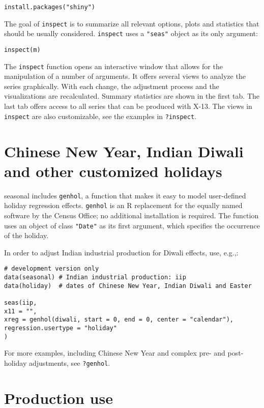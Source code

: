 \begin{verbatim}
install.packages("shiny")
\end{verbatim}

The goal of \texttt{inspect} is to summarize all relevant options, plots
and statistics that should be usually considered. \texttt{inspect} uses
a \texttt{"seas"} object as its only argument:

\begin{verbatim}
inspect(m)
\end{verbatim}

The \texttt{inspect} function opens an interactive window that allows
for the manipulation of a number of arguments. It offers several views
to analyze the series graphically. With each change, the adjustment
process and the visualizations are recalculated. Summary statistics are
shown in the first tab. The last tab offers access to all series that
can be produced with X-13. The views in \texttt{inspect} are also
customizable, see the examples in \texttt{?inspect}.

\section{Chinese New Year, Indian Diwali and other customized
holidays}\label{chinese-new-year-indian-diwali-and-other-customized-holidays}

seasonal includes \texttt{genhol}, a function that makes it easy to
model user-defined holiday regression effects. \texttt{genhol} is an R
replacement for the equally named software by the Census Office; no
additional installation is required. The function uses an object of
class \texttt{"Date"} as its first argument, which specifies the
occurrence of the holiday.

In order to adjust Indian industrial production for Diwali effects, use,
e.g.,:

\begin{verbatim}
# development version only
data(seasonal) # Indian industrial production: iip
data(holiday)  # dates of Chinese New Year, Indian Diwali and Easter

seas(iip, 
x11 = "",
xreg = genhol(diwali, start = 0, end = 0, center = "calendar"), 
regression.usertype = "holiday"
)
\end{verbatim}

For more examples, including Chinese New Year and complex pre- and
post-holiday adjustments, see \texttt{?genhol}.

\section{Production use}\label{production-use}

